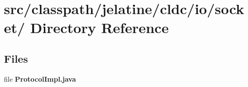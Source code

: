 \section{src/classpath/jelatine/cldc/io/socket/ Directory Reference}
\label{dir_fca1793e5e942f2b71e547173a6a6d06}
\subsection*{Files}
\begin{DoxyCompactItemize}
\item 
file {\bfseries ProtocolImpl.java}
\end{DoxyCompactItemize}
